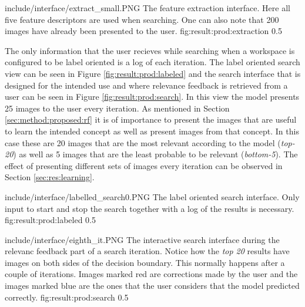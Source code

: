 \singlefigurenear
{include/interface/extract_small.PNG}
{The feature extraction interface. Here all five feature descriptors are used when searching. One can also note that 200 images have already been presented to the user.}
{fig:result:prod:extraction}
{0.5}

The only information that the user recieves while searching when a workspace is configured to be label oriented is a log of each iteration. The label oriented search view can be seen in Figure \ref{fig:result:prod:labeled} and the search interface that is designed for the intended use and where relevance feedback is retrieved from a user can be seen in Figure \ref{fig:result:prod:search}. In this view the model presents 25 images to the user every iteration. As mentioned in Section \ref{sec:method:proposed:rf} it is of importance to present the images that are useful to learn the intended concept as well as present images from that concept. In this case these are 20 images that are the most relevant according to the model (\emph{top-20}) as well as 5 images that are the least probable to be relevant (\emph{bottom-5}). The effect of presenting different sets of images every iteration can be observed in Section \ref{sec:res:learning}.

\singlefigurenear
{include/interface/labelled_search0.PNG}
{The label oriented search interface. Only input to start and stop the search together with a log of the results is necessary.}
{fig:result:prod:labeled}
{0.5}

\singlefigurenear
{include/interface/eighth_it.PNG}
{The interactive search interface during the relevanc feedback part of a search iteration. Notice how the \emph{top 20} results have images on both sides of the decision boundary. This normally happens after a couple of iterations. Images marked red are corrections made by the user and the images marked blue are the ones that the user considers that the model predicted correctly.}
{fig:result:prod:search}
{0.5}


